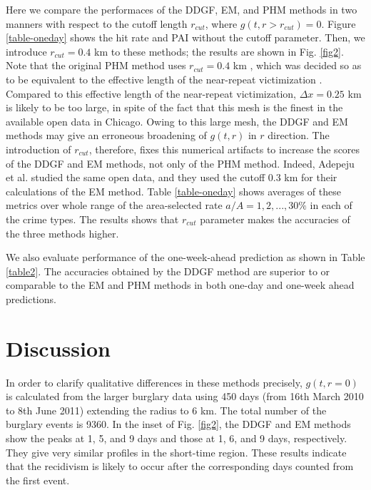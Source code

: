 \documentclass[review]{elsarticle}
\begin{document}
Here we compare the performaces of the DDGF, EM, and PHM methods in two manners with respect to the cutoff length $r_{cut}$, where  $g(t, r>r_{cut})=0$.
Figure \ref{table-oneday} shows
the hit rate and PAI without the cutoff parameter.
Then, we introduce  $r_{cut}=0.4$ km
to these methods; the results are shown in Fig. \ref{fig2}.
Note that the original PHM method uses $r_{cut}=0.4$ km \cite{bowers}, which 
was decided so as to be equivalent to 
 the effective length of the near-repeat victimization 
 \cite{johnson2004a, johnson2004b,bowers2005}. 
Compared to this effective length of the near-repeat victimization,
$\Delta x=0.25$ km is likely to be too large, 
in spite of the fact that this mesh is the finest in the available open data in Chicago.
Owing to this large mesh,
the DDGF and EM methods may give 
an erroneous broadening of $g(t,r)$ in $r$ direction.
The introduction of $r_{cut}$, therefore, 
fixes this numerical artifacts to
increase the scores of the DDGF and EM methods, not only of the PHM method.
Indeed,
Adepeju et al. \cite{adepeju2016} studied the same open data, and they used 
the cutoff $0.3$ km for their calculations of the EM method.
Table \ref{table-oneday} shows averages of these metrics over 
whole range of the area-selected rate $a/A = 1, 2, ..., 30\%$ in each of the crime types.
The results shows that  $r_{cut}$ parameter makes the accuracies of the three methods higher.

We also evaluate performance of the one-week-ahead prediction as shown in Table \ref{table2}.
The accuracies obtained by the DDGF method are superior to or comparable to the EM and PHM methods in both one-day and one-week ahead predictions.



\section{Discussion}\label{sec:dis}

In order to clarify qualitative differences in these methods precisely, 
$g(t,r=0)$ is calculated from the larger burglary data using 450 days (from 16th March 2010 to 8th June 2011) extending the radius to 6 km.
The total number of the burglary events is 9360.
In the inset of Fig. \ref{fig2},
the DDGF and EM methods show the peaks at 1, 5, and 9 days and those at 1, 6, and 9 days, respectively.
They give very similar profiles in the short-time region.
These results indicate that the recidivism is likely to occur after the corresponding days counted from the first event.
\end{document}
